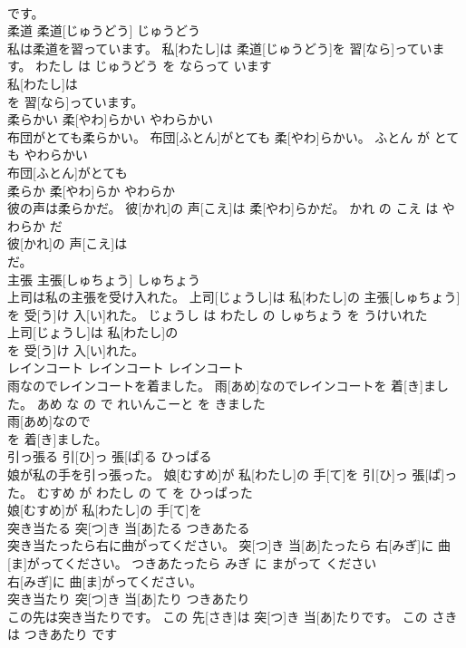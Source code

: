 \documentclass[8pt]{extreport}
\begin{document}
\begin{CJK}{UTF8}{min}
\\	です。		
\\	柔道	柔道[じゅうどう]	じゅうどう	
\\	私は柔道を習っています。	私[わたし]は 柔道[じゅうどう]を 習[なら]っています。	わたし は じゅうどう を ならって います	
\\	私[わたし]は
\\	を 習[なら]っています。		
\\	柔らかい	柔[やわ]らかい	やわらかい	
\\	布団がとても柔らかい。	布団[ふとん]がとても 柔[やわ]らかい。	ふとん が とても やわらかい	
\\	布団[ふとん]がとても
\\	柔らか	柔[やわ]らか	やわらか	
\\	彼の声は柔らかだ。	彼[かれ]の 声[こえ]は 柔[やわ]らかだ。	かれ の こえ は やわらか だ	
\\	彼[かれ]の 声[こえ]は
\\	だ。		
\\	主張	主張[しゅちょう]	しゅちょう	
\\	上司は私の主張を受け入れた。	上司[じょうし]は 私[わたし]の 主張[しゅちょう]を 受[う]け 入[い]れた。	じょうし は わたし の しゅちょう を うけいれた	
\\	上司[じょうし]は 私[わたし]の
\\	を 受[う]け 入[い]れた。		
\\	レインコート	レインコート	レインコート	
\\	雨なのでレインコートを着ました。	雨[あめ]なのでレインコートを 着[き]ました。	あめ な の で れいんこーと を きました	
\\	雨[あめ]なので
\\	を 着[き]ました。		
\\	引っ張る	引[ひ]っ 張[ぱ]る	ひっぱる	
\\	娘が私の手を引っ張った。	娘[むすめ]が 私[わたし]の 手[て]を 引[ひ]っ 張[ぱ]った。	むすめ が わたし の て を ひっぱった	
\\	娘[むすめ]が 私[わたし]の 手[て]を
\\	突き当たる	突[つ]き 当[あ]たる	つきあたる	
\\	突き当たったら右に曲がってください。	突[つ]き 当[あ]たったら 右[みぎ]に 曲[ま]がってください。	つきあたったら みぎ に まがって ください	
\\	右[みぎ]に 曲[ま]がってください。		
\\	突き当たり	突[つ]き 当[あ]たり	つきあたり	
\\	この先は突き当たりです。	この 先[さき]は 突[つ]き 当[あ]たりです。	この さき は つきあたり です	

\end{CJK}
\end{document}
